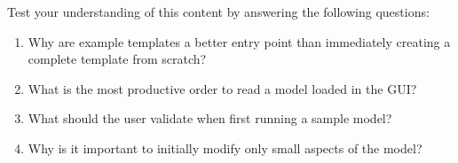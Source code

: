 Test your understanding of this content by answering the following questions:

\begin{enumerate}
\item Why are example templates a better entry point than immediately creating a complete template from scratch?

\item What is the most productive order to read a model loaded in the GUI?

\item What should the user validate when first running a sample model?

\item Why is it important to initially modify only small aspects of the model?
\end{enumerate}
